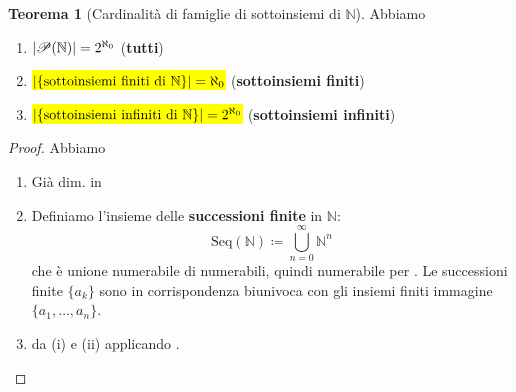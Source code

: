 \documentclass[a4paper,10pt]{article}
\theoremstyle{definition}
\newcommand{\na}{\mathbb{N}} %
\theoremstyle{indentdefinition}
\theoremstyle{indentpostulate}
\theoremstyle{indenttheorem}
\newtheorem{thm}{Teorema}[section]
\theoremstyle{myremark}
\theoremstyle{indentgeneral}
\newenvironment{myboxed} 
{\noindent\begin{lrbox}{\mybox}\begin{minipage}{\textwidth}}
{\end{minipage}\end{lrbox}\fbox{\usebox{\mybox}}}
\begin{document}
\begin{myboxed}
\begin{thm}[Cardinalità di famiglie di sottoinsiemi di $\na$] Abbiamo
\begin{enumerate}
    \item $\abs{\mathscr{P}(\na)}=2^{\aleph_0}$ (\textbf{tutti})
    \item \hl{$\abs{\{\text{sottoinsiemi finiti di $\na$}\}}=\aleph_0$} (\textbf{sottoinsiemi finiti})
    \item \hl{$\abs{\{\text{sottoinsiemi infiniti di $\na$}\}}=2^{\aleph_0}$} (\textbf{sottoinsiemi infiniti})
\end{enumerate}
\end{thm}
\end{myboxed}
\begin{proof}
    Abbiamo
    \begin{enumerate}
        \item Già dim. in 
        \item Definiamo l'insieme delle \textbf{successioni finite} in $\na$:
        $$\text{Seq}(\na)\coloneqq\bigcup_{n=0}^\infty\na^n$$
        che è unione numerabile di numerabili, quindi numerabile per .  Le successioni finite $\{a_k\}$ sono in corrispondenza biunivoca con gli insiemi finiti immagine $\{a_1,\dots,a_n\}$.
        \item da (i) e (ii) applicando .
    \end{enumerate}
\end{proof}
\end{document}
